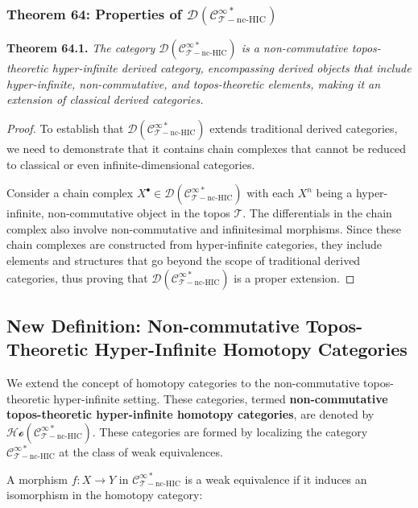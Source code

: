 \documentclass{article}
\begin{document}
\subsubsection{Theorem 64: Properties of \(\mathcal{D}(\mathcal{C}_{\mathcal{T}-\text{nc-HIC}}^{\infty *})\)}
\textbf{Theorem 64.1.} \textit{The category \(\mathcal{D}(\mathcal{C}_{\mathcal{T}-\text{nc-HIC}}^{\infty *})\) is a non-commutative topos-theoretic hyper-infinite derived category, encompassing derived objects that include hyper-infinite, non-commutative, and topos-theoretic elements, making it an extension of classical derived categories.}

\begin{proof}
To establish that \(\mathcal{D}(\mathcal{C}_{\mathcal{T}-\text{nc-HIC}}^{\infty *})\) extends traditional derived categories, we need to demonstrate that it contains chain complexes that cannot be reduced to classical or even infinite-dimensional categories.

Consider a chain complex \(X^{\bullet} \in \mathcal{D}(\mathcal{C}_{\mathcal{T}-\text{nc-HIC}}^{\infty *})\) with each \(X^n\) being a hyper-infinite, non-commutative object in the topos \(\mathcal{T}\). The differentials in the chain complex also involve non-commutative and infinitesimal morphisms. Since these chain complexes are constructed from hyper-infinite categories, they include elements and structures that go beyond the scope of traditional derived categories, thus proving that \(\mathcal{D}(\mathcal{C}_{\mathcal{T}-\text{nc-HIC}}^{\infty *})\) is a proper extension.
\end{proof}

\subsection{New Definition: Non-commutative Topos-Theoretic Hyper-Infinite Homotopy Categories}
We extend the concept of homotopy categories to the non-commutative topos-theoretic hyper-infinite setting. These categories, termed \textbf{non-commutative topos-theoretic hyper-infinite homotopy categories}, are denoted by \(\mathcal{Ho}(\mathcal{C}_{\mathcal{T}-\text{nc-HIC}}^{\infty *})\). These categories are formed by localizing the category \(\mathcal{C}_{\mathcal{T}-\text{nc-HIC}}^{\infty *}\) at the class of weak equivalences.

A morphism \(f: X \to Y\) in \(\mathcal{C}_{\mathcal{T}-\text{nc-HIC}}^{\infty *}\) is a weak equivalence if it induces an isomorphism in the homotopy category:
\end{document}
